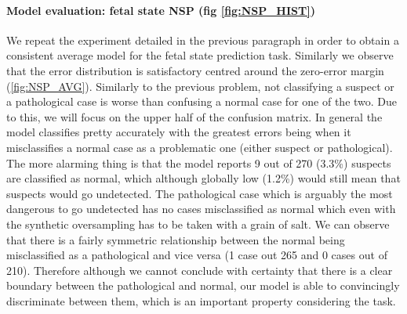 \documentclass[11pt,a4paper]{article}
\begin{document}
\paragraph{Model evaluation: fetal state NSP (fig \ref{fig:NSP_HIST})}
We repeat the experiment detailed in the previous paragraph in order to obtain a consistent average model for the fetal state prediction task. Similarly we observe that the error distribution is satisfactory centred around the zero-error margin (\ref{fig:NSP_AVG}). Similarly to the previous problem, not classifying a suspect or a pathological case is worse than confusing a normal case for one of the two. Due to this, we will focus on the upper half of the confusion matrix. In general the model classifies pretty accurately with the greatest errors being when it misclassifies a normal case as a problematic one (either suspect or pathological). The more alarming thing is that the model reports 9 out of 270 (3.3\%)  suspects are classified as normal, which although globally low (1.2\%) would still mean that suspects would go undetected. The pathological case which is arguably the most dangerous to go undetected has no cases misclassified as normal which even with the synthetic oversampling has to be taken with a grain of salt. We can observe that there is a fairly symmetric relationship between the normal being misclassified as a pathological and vice versa (1 case out 265 and 0 cases out of 210). Therefore although we cannot conclude with certainty that there is a clear boundary between the pathological and normal, our model is able to convincingly discriminate between them, which is an important property considering the task.
\end{document}
